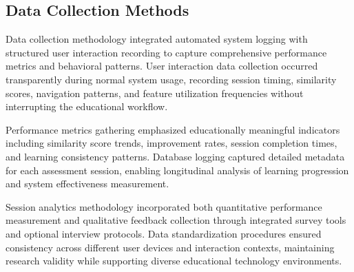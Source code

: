 {\subsection{Data Collection Methods}

Data collection methodology integrated automated system logging with structured user interaction recording to capture comprehensive performance metrics and behavioral patterns. User interaction data collection occurred transparently during normal system usage, recording session timing, similarity scores, navigation patterns, and feature utilization frequencies without interrupting the educational workflow.

Performance metrics gathering emphasized educationally meaningful indicators including similarity score trends, improvement rates, session completion times, and learning consistency patterns. Database logging captured detailed metadata for each assessment session, enabling longitudinal analysis of learning progression and system effectiveness measurement.

Session analytics methodology incorporated both quantitative performance measurement and qualitative feedback collection through integrated survey tools and optional interview protocols. Data standardization procedures ensured consistency across different user devices and interaction contexts, maintaining research validity while supporting diverse educational technology environments.
}

